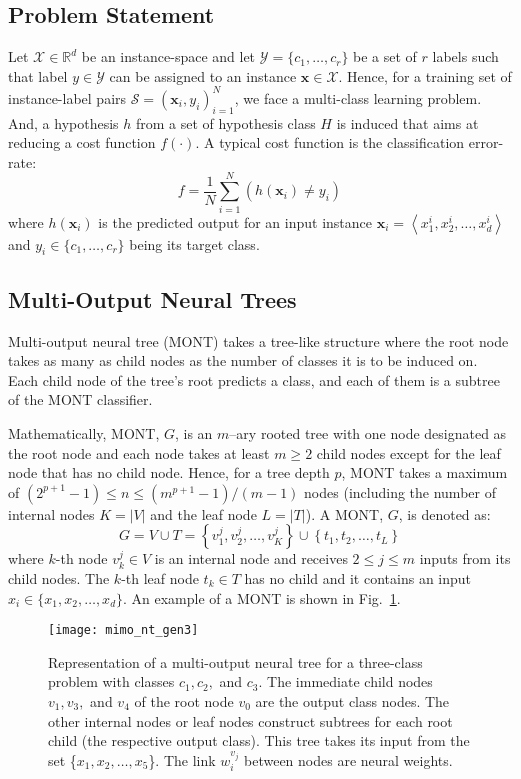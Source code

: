 \documentclass[conference]{IEEEtran}
\begin{document}
\subsection{Problem Statement} \label{sec:problem_stmt}
Let $ \mathcal{X} \in \mathbb{R}^d$ be an instance-space and let $ \mathcal{Y} = \{c_1, \ldots,c_r \} $ be a set of $ r $ labels such that label $ y \in \mathcal{Y} $ can be assigned to an instance $ \textbf{x} \in \mathcal{X} $. Hence, for a training set of instance-label pairs $ \mathcal{S} = \left(\textbf{x}_i, y_i \right)_{i=1}^{N} $, we face a multi-class learning problem. And, a hypothesis $ h $ from a set of hypothesis class $ H $ is induced that aims at reducing a cost function $ f(\cdot)$. A typical cost function is the classification error-rate:
\begin{equation}
\label{eq:error_rate}
f =  \frac{1}{N}\sum\limits_{i=1}^{N} (h(\textbf{x}_i) \ne y_i)
\end{equation}
where $ h(\textbf{x}_i)$ is the predicted output for an input instance $\textbf{x}_i = \left\langle x^i_1, x^i_2, \ldots, x^i_d \right\rangle$ and $ y_i \in \{c_1, \ldots,c_r \}$ being its target class.
\subsection{Multi-Output Neural Trees}
\label{sec:nt}
Multi-output neural tree (MONT) takes a tree-like structure where the root node takes as many as child nodes as the number of classes it is to be induced on. Each child node of the tree's root predicts a class, and each of them is a subtree of the MONT classifier.

Mathematically, MONT, $ G $, is an $ m $--ary rooted tree with one node designated as the root node and each node takes at least $ m \ge 2$ child nodes except for the leaf node that has no child node. Hence, for a tree depth $ p $, MONT takes a maximum of $ (2^{p+1}-1) \le n \le (m^{p+1}-1)/(m-1)$ nodes (including the number of internal nodes $ K = |V| $ and the leaf node $ L = |T|$). A MONT, $ G $, is denoted as:
\begin{equation}
\label{eq_mont}
G = V \cup T = \left\lbrace v^j_1,v^j_2,\ldots,v^j_K \right\rbrace  \cup \left\lbrace t_1, t_2,\ldots, t_L \right\rbrace 
\end{equation}
where $ k $-th node $ v^j_k \in V$ is an internal node and receives $ 2 \le j \le m $ inputs from its child nodes. The $ k $-th leaf node $ t_k \in T$ has no child and it contains an input $ x_i \in  \{x_1,x_2,\ldots,x_d\}$. An example of a MONT is shown in Fig.~\ref{fig:mont}.  
\begin{figure}	
    \centerline{\texttt{[image: mimo\_nt\_gen3]}}
    \caption{Representation of a multi-output neural tree for a three-class problem with classes $ c_1, c_2, $ and $ c_3 $. The immediate child nodes $ v_1, v_3, $ and $ v_4 $ of the root node $ v_0 $ are the output class nodes. The other internal nodes or leaf nodes construct subtrees for each root child (the respective output class). This tree takes its input from the set \{$x_1, x_2, \ldots, x_5$\}. The link $ w_i^{v_j} $ between nodes are neural weights.}
    \label{fig:mont}
\end{figure}
\end{document}
